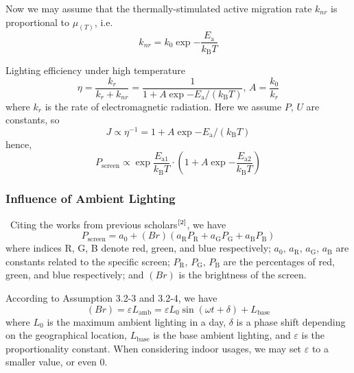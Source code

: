 \documentclass[12pt]{article}
\begin{document}
Now we may assume that the thermally-stimulated active migration rate $k_{nr}$ is proportional to $\mu_(T)$, i.e.
\begin{equation}
	k_{nr}=k_0\exp{-\frac{E_\mathrm {a}}{k_\mathrm B T}}
\end{equation}

Lighting efficiency under high temperature
\begin{equation}
	\eta=\frac{k_r}{k_r+k_{nr}}=\frac{1}{1+A\exp{-E_\mathrm {a}/(k_\mathrm B T)}},\,A=\frac{k_0}{k_r}
\end{equation}
where $k_r$ is the rate of electromagnetic radiation. Here we assume $P,\,U$ are constants, so
\begin{equation}
	J\propto \eta^{-1}= 1+A\exp{-E_\mathrm {a}/(k_\mathrm B T)}
\end{equation}
hence, 
\begin{equation}
	P_\mathrm {screen}\propto \exp{\frac{E_\mathrm{a1}}{k_\mathrm B T}}\cdot\left(1+A\exp{-\frac{E_\mathrm {a2}}{k_\mathrm B T}}\right)
\end{equation}

\subsubsection{Influence of Ambient Lighting}

\quad \, Citing the works from previous scholars$\rm ^{[2]}$, we have
\begin{equation}
	P_\mathrm{screen}=a_0+(Br)(a_\mathrm RP_\mathrm R+a_\mathrm GP_\mathrm G+a_\mathrm BP_\mathrm B)
\end{equation}
where indices R, G, B denote red, green, and blue respectively; $a_0,\,a_\mathrm R,\,a_\mathrm G,\,a_\mathrm B$ are constants related to the specific screen; $P_\mathrm R,\,P_\mathrm G,\,P_\mathrm B$ are the percentages of red, green, and blue respectively; and $(Br)$ is the brightness of the screen.

According to Assumption 3.2-3 and 3.2-4, we have
\begin{equation}
	(Br)=\varepsilon L_\mathrm{amb}=\varepsilon L_0\sin{\left(\omega t+\delta\right)}+L_\mathrm{base}
\end{equation}
where $L_0$ is the maximum ambient lighting in a day, $\delta$ is a phase shift depending on the geographical location, $L_\mathrm{base}$ is the base ambient lighting, and $\varepsilon$ is the proportionality constant. When considering indoor usages, we may set $\varepsilon$ to a smaller value, or even 0.
\end{document}

